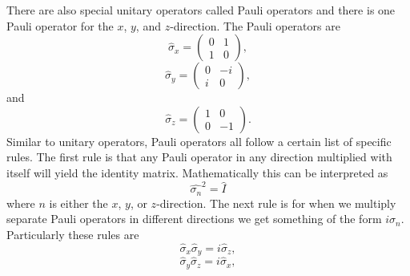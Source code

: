 \documentclass[twocolumn]{article}
\begin{document}
There are also special unitary operators called Pauli operators and there is one Pauli operator for the $x$, $y$, and $z$-direction. The Pauli operators are
\begin{equation}\label{eq:16}
\hat{\sigma}_x=
\begin{pmatrix}
0 & 1 \\
1 & 0
\end{pmatrix},
\end{equation}
\begin{equation}\label{eq:17}
\hat{\sigma}_y=
\begin{pmatrix}
0 & -i \\
i & 0
\end{pmatrix},
\end{equation}
and
\begin{equation}\label{eq:18}
\hat{\sigma}_z=
\begin{pmatrix}
1 & 0 \\
0 & -1
\end{pmatrix}.
\end{equation}
Similar to unitary operators, Pauli operators all follow a certain list of specific rules. The first rule is that any Pauli operator in any direction multiplied with itself will yield the identity matrix. Mathematically this can be interpreted as
\begin{equation}\label{eq:19}
\hat{\sigma_n}^2=\hat{I}
\end{equation}
where $n$ is either the $x$, $y$, or $z$-direction. The next rule is for when we multiply separate Pauli operators in different directions we get something of the form $i\sigma_n$. Particularly these rules are
\begin{equation}\label{eq:20}
\hat{\sigma}_x\hat{\sigma}_y=i\hat{\sigma}_z,
\end{equation}
\begin{equation}\label{eq:21}
\hat{\sigma}_y\hat{\sigma}_z=i\hat{\sigma}_x,
\end{equation}
\end{document}

